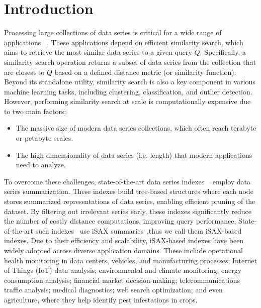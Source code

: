 \chapter{Introduction}
\label{chapter:introduction}


Processing large collections of data series is critical for a wide range of applications
~\cite{DBLP:journals/sigmod/Palpanas15,DBLP:journals/dagstuhl-reports/BagnallCPZ19,Palpanas2019}.
These applications depend on efficient similarity search, which aims to retrieve the most similar
data series to a given query $Q$.
Specifically, a similarity search operation returns a subset of data series from the collection 
that are closest to $Q$  based on a defined distance metric (or similarity function).
% 
Beyond its standalone utility, similarity search is also a key component in various machine 
learning tasks, including clustering, classification, and outlier detection. However, 
performing similarity search at scale is computationally expensive due to two main factors: 
\begin{itemize}
\item The massive size of modern data series collections, which often reach terabyte or petabyte scales.
\item The high dimensionality of data series (i.e. length) that modern applications need to analyze.
\end{itemize}
% 
To overcome these challenges, state-of-the-art data series indexes
~\cite{DBLP:journals/pvldb/EchihabiZPB18,isax2plus,wang2013data,peng2018paris,parisplus,peng2020messi,PFP21-I,PFP21-II,hercules,dumpy}
employ data series summarization. These indexes build tree-based structures where each node 
stores summarized representations of data series, enabling efficient pruning of the dataset.
By filtering out irrelevant series early, these indexes significantly reduce the number of costly 
distance computations, improving query performance.
State-of-the-art such indexes~\cite{peng2020messi,parisplus,peng2021sing} 
use iSAX summaries~\cite{isax2plus,isaxfamily},thus we call them iSAX-based indexes.  
%
Due to their efficiency and scalability, iSAX-based indexes have been widely adopted across 
diverse application domains. These include operational health monitoring in data centers, 
vehicles, and manufacturing processes; Internet of Things (IoT) data analysis; environmental 
and climate monitoring; energy consumption analysis; financial market decision-making; 
telecommunications traffic analysis; medical diagnostics; web search optimization; 
and even agriculture, where they help identify pest infestations in crops.
